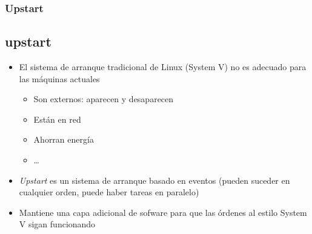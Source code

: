 \documentclass[ucs]{beamer}
\begin{document}
\begin{frame}[fragile]
\frametitle{Upstart}

\subsection{upstart}

\begin{itemize}
\item
El sistema de arranque tradicional de Linux (System V)
no es adecuado para las máquinas actuales
\begin{itemize}
\item
Son externos: aparecen y desaparecen
\item
Están en red
\item
Ahorran energía
\item \ldots
\end{itemize}


\item
\emph{Upstart} es un sistema de arranque basado en eventos
(pueden suceder en cualquier orden, puede haber tareas
en paralelo)
\item
Mantiene una capa adicional de sofware para que las órdenes
al estilo System V sigan funcionando



\end{itemize}
\end{frame}
\end{document}
